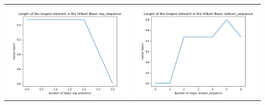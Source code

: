 \documentclass[10pt]{article}
\begin{document}
\begin{tabular}{c|c}
\begin{minipage}{.4\textwidth}
\includegraphics[width=\textwidth]{"DATA/4d/4 generators 2 bound J/top_sequence LENGTH"}
\end{minipage} &
\begin{minipage}{.4\textwidth}
\includegraphics[width=\textwidth]{"DATA/4d/4 generators 2 bound J bottomup/bottom_sequence LENGTH"}
\end{minipage}
\end{tabular}
\end{document}
